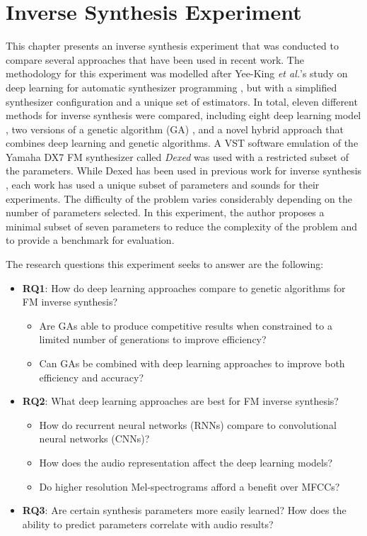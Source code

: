 \chapter{Inverse Synthesis Experiment}
\label{chapter:inverse_synth_experiment}

This chapter presents an inverse synthesis experiment that was conducted to compare several approaches that have been used in recent work. The methodology for this experiment was modelled after Yee-King \textit{et al.}'s study on deep learning for automatic synthesizer programming \cite{yee2018automatic}, but with a simplified synthesizer configuration and a unique set of estimators. In total, eleven different methods for inverse synthesis were compared, including eight deep learning model \cite{barkan2019inversynth, yee2018automatic}, two versions of a genetic algorithm (GA) \cite{horner1993machine, tatar2016automatic}, and a novel hybrid approach that combines deep learning and genetic algorithms. A VST software emulation of the Yamaha DX7 FM synthesizer called \textit{Dexed} was used with a restricted subset of the parameters. While Dexed has been used in previous work for inverse synthesis \cite{yee2018automatic, luke2019stochastic, le2021improving, masudo2021quality}, each work has used a unique subset of parameters and sounds for their experiments. The difficulty of the problem varies considerably depending on the number of parameters selected. In this experiment, the author proposes a minimal subset of seven parameters to reduce the complexity of the problem and to provide a benchmark for evaluation.

The research questions this experiment seeks to answer are the following:
\begin{itemize}
    \item \textbf{RQ1}: How do deep learning approaches compare to genetic algorithms for FM inverse synthesis?
    \begin{itemize}
    	\item Are GAs able to produce competitive results when constrained to a limited number of generations to improve efficiency?
    	\item Can GAs be combined with deep learning approaches to improve both efficiency and accuracy?
    \end{itemize}
    \item \textbf{RQ2}: What deep learning approaches are best for FM inverse synthesis?
    \begin{itemize}
    	\item How do recurrent neural networks (RNNs) compare to convolutional neural networks (CNNs)?
    	\item How does the audio representation affect the deep learning models?
    	\item Do higher resolution Mel-spectrograms afford a benefit over MFCCs?
    \end{itemize}
    \item \textbf{RQ3}: Are certain synthesis parameters more easily learned? How does the ability to predict parameters correlate with audio results?
\end{itemize}

